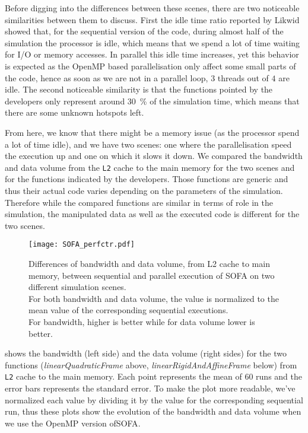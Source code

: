 Before digging into the differences between these scenes, there are two noticeable similarities between them to discuss.
First the idle time ratio reported by \gls{Likwid} showed that, for the sequential version of the code, during almost half of the simulation the processor is idle, which means that we spend a lot of time waiting for \gls{I/O} or memory accesses.
In parallel  this idle time increases, yet this behavior is expected as the \gls{OpenMP} based parallelisation only affect some small parts of the code, hence as soon as we are not in a parallel loop, $3$ threads out of $4$ are idle.
The second noticeable similarity is that the functions pointed by the developers only represent around \SI{30}{\%} of the simulation time, which means that there are some unknown hotspots left.

From here, we know that there might be a memory issue (as the processor spend a lot of time idle), and we have two scenes: one where the parallelisation speed the execution up and one on which it slows it down.
We compared the bandwidth and data volume from the \texttt{L2} cache to the main memory for the two scenes and for the functions indicated by the developers.
Those functions are generic and thus their actual code varies depending on the parameters of the simulation.
Therefore while the compared functions are similar in terms of role in the simulation, the manipulated data as well as the executed code is different for the two scenes.

\begin{figure}[htb]
    \centering
    \texttt{[image: SOFA\_perfctr.pdf]}
    \caption[SOFA likwid results]{Differences of bandwidth and data volume, from L2 cache to main memory, between sequential and parallel execution of \gls{SOFA} on two different simulation scenes.
        \\
        For both bandwidth and data volume, the value is normalized to the mean value of the corresponding sequential executions.
        \\
        For bandwidth, higher is better while for data volume lower is better.
    }
    \label{fig:SOFA-perfctr}
\end{figure}

 shows the bandwidth (left side) and the data volume (right sides) for the two functions (\emph{linearQuadraticFrame} above, \emph{linearRigidAndAffineFrame} below) from \texttt{L2} cache to the main memory.
Each point represents the mean of $60$ runs and the error bars represents the standard error.
To make the plot more readable, we've normalized each value by dividing it by the value for the corresponding sequential run, thus these plots show the evolution of the bandwidth and data volume when we use the \gls{OpenMP} version of\gls{SOFA}.

